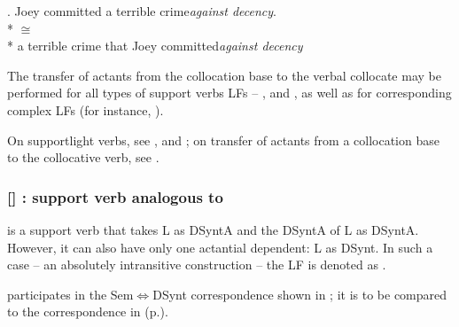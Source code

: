 \begingroup
\small

\ex.\label{ex:Oper1-CRIME} Joey committed a terrible crime\thinspace{}\thinspace{}\emph{against decency}.\\*
     $\cong$ \\*
     a terrible crime that Joey committed\thinspace{}\thinspace{}\emph{against decency}

\endgroup

The transfer of actants from the collocation base to the verbal collocate may be performed for all types of support verbs LFs -- ,  and , as well as for corresponding complex LFs (for instance, ).

\begin{furtherreading}
On support\slashs light verbs, see \textcite{GrossM1981}, \textcite{Melcuk2022b} and \textcite{FleischhauerRiccio2025}; on transfer of actants from a collocation base to the collocative verb, see \textcites[253--272]{AlonsoRamos2004}{AlonsoRamos2007}.
\end{furtherreading}

\subsubsection*{{\small []}  : support verb analogous to\newline {}}\label{lf:Func-i}

 is a support verb that takes L as DSyntA\thinspace{} and the DSyntA\thinspace{} of L as DSyntA\thinspace{}. However, it can also have only one actantial dependent: L as DSynt\thinspace{}. In such a case -- an absolutely intransitive construction -- the LF is denoted as .

 participates in the Sem\thinspace$\Leftrightarrow$\thinspace{}DSynt correspondence shown in ; it is to be compared to the  correspondence in  (p.\thinspace\pageref{fig:Oper-i}).

